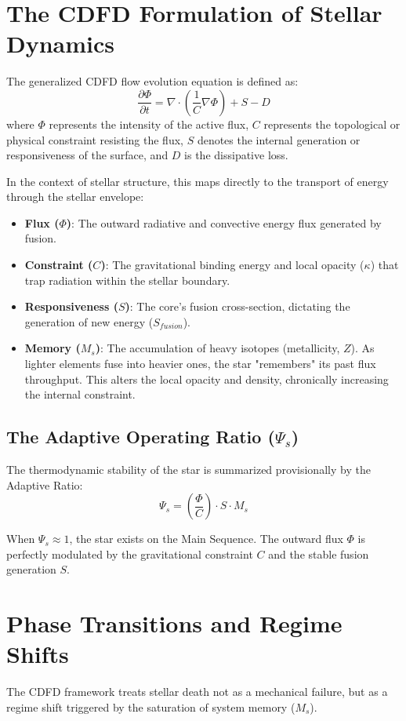 \documentclass[11pt,a4paper]{article}
\begin{document}
\section{The CDFD Formulation of Stellar Dynamics}
The generalized CDFD flow evolution equation is defined as:
\begin{equation}
    \frac{\partial \Phi}{\partial t} = \nabla \cdot \left( \frac{1}{C} \nabla \Phi \right) + S - D
\end{equation}
where $\Phi$ represents the intensity of the active flux, $C$ represents the topological or physical constraint resisting the flux, $S$ denotes the internal generation or responsiveness of the surface, and $D$ is the dissipative loss.

In the context of stellar structure, this maps directly to the transport of energy through the stellar envelope:
\begin{itemize}
    \item \textbf{Flux ($\Phi$)}: The outward radiative and convective energy flux generated by fusion.
    \item \textbf{Constraint ($C$)}: The gravitational binding energy and local opacity ($\kappa$) that trap radiation within the stellar boundary.
    \item \textbf{Responsiveness ($S$)}: The core's fusion cross-section, dictating the generation of new energy ($S_{fusion}$).
    \item \textbf{Memory ($M_s$)}: The accumulation of heavy isotopes (metallicity, $Z$). As lighter elements fuse into heavier ones, the star "remembers" its past flux throughput. This alters the local opacity and density, chronically increasing the internal constraint.
\end{itemize}

\subsection{The Adaptive Operating Ratio ($\Psi_s$)}
The thermodynamic stability of the star is summarized provisionally by the Adaptive Ratio:
\begin{equation}
    \Psi_s = \left( \frac{\Phi}{C} \right) \cdot S \cdot M_s
\end{equation}

When $\Psi_s \approx 1$, the star exists on the Main Sequence. The outward flux $\Phi$ is perfectly modulated by the gravitational constraint $C$ and the stable fusion generation $S$.

\section{Phase Transitions and Regime Shifts}
The CDFD framework treats stellar death not as a mechanical failure, but as a regime shift triggered by the saturation of system memory ($M_s$).
\end{document}
